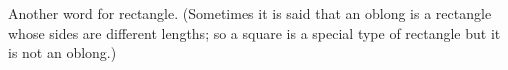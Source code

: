 Another word for rectangle. (Sometimes it is said that an oblong is
 a rectangle whose sides are different lengths; so a square is a
special type of rectangle but it is not an oblong.)